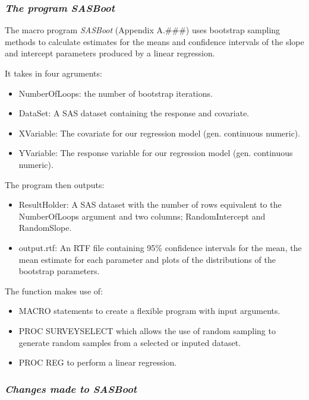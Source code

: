 \documentclass[]{article}
\providecommand{\tightlist}{%
  \setlength{\itemsep}{0pt}\setlength{\parskip}{0pt}}
\begin{document}
\subsubsection{\texorpdfstring{\emph{The program
SASBoot}}{The program SASBoot}}\label{the-program-sasboot}

The macro program \emph{SASBoot} (Appendix A.\#\#\#) uses bootstrap
sampling methods to calculate estimates for the means and confidence
intervals of the slope and intercept parameters produced by a linear
regression.

It takes in four agruments:

\begin{itemize}
\tightlist
\item
  NumberOfLoops: the number of bootstrap iterations.
\item
  DataSet: A SAS dataset containing the response and covariate.
\item
  XVariable: The covariate for our regression model (gen. continuous
  numeric).
\item
  YVariable: The response variable for our regression model (gen.
  continuous numeric).
\end{itemize}

The program then outputs:

\begin{itemize}
\tightlist
\item
  ResultHolder: A SAS dataset with the number of rows equivalent to the
  NumberOfLoops argument and two columns; RandomIntercept and
  RandomSlope.
\item
  output.rtf: An RTF file containing 95\% confidence intervals for the
  mean, the mean estimate for each parameter and plots of the
  distributions of the bootstrap parameters.
\end{itemize}

The function makes use of:

\begin{itemize}
\tightlist
\item
  MACRO statements to create a flexible program with input arguments.
\item
  PROC SURVEYSELECT which allows the use of random sampling to generate
  random samples from a selected or inputed dataset.
\item
  PROC REG to perform a linear regression.
\end{itemize}

\subsubsection{\texorpdfstring{\emph{Changes made to
SASBoot}}{Changes made to SASBoot}}\label{changes-made-to-sasboot}
\end{document}
